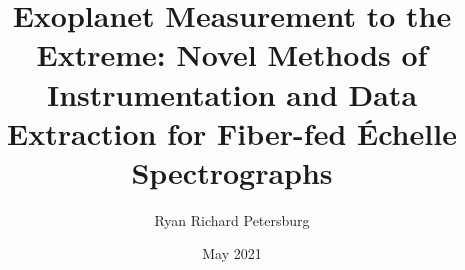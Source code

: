 \documentclass[12pt]{yalephd}
\begin{document}
\titlespacing*{\chapter}{0pt}{50pt}{30pt}%

	\title{Exoplanet Measurement to the Extreme: Novel Methods of Instrumentation and Data Extraction for Fiber-fed \'{E}chelle Spectrographs}
	\author{Ryan Richard Petersburg}
	\date{May 2021}


    
	
    \maketitle
    \makecopyright
	
    
    
	
    \tableofcontents
    \listoffigures
    \listoftables
    
    \mainmatter      %

	
	
	
	
	
	

    
    
    
\end{document}
